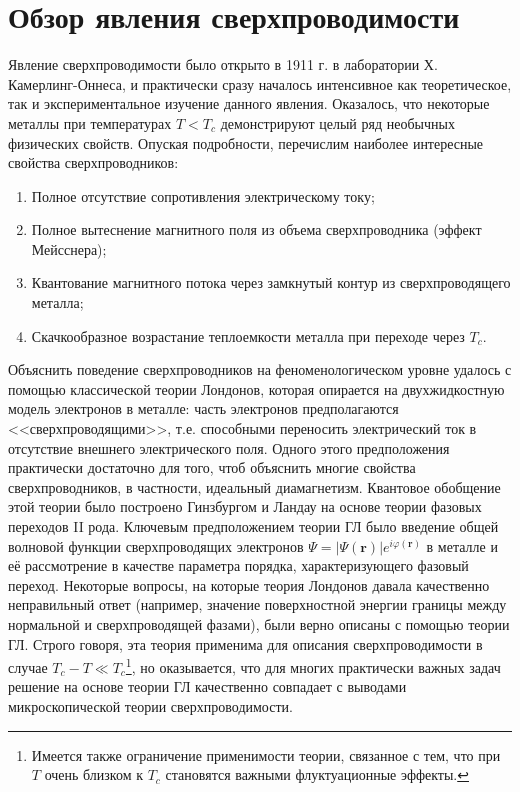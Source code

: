 \section{Обзор явления сверхпроводимости} \label{s1_sc_phys}
Явление сверхпроводимости было открыто в 1911 г. в лаборатории Х. Камерлинг-Оннеса, и практически сразу началось интенсивное как теоретическое, так и экспериментальное изучение данного явления. Оказалось, что некоторые металлы при температурах $T<T_c$ демонстрируют целый ряд необычных физических свойств. Опуская подробности, перечислим наиболее интересные свойства сверхпроводников:
\begin{enumerate}
	\item Полное отсутствие сопротивления электрическому току;
	\item Полное вытеснение магнитного поля из объема сверхпроводника (эффект Мейсснера);
	\item Квантование магнитного потока через замкнутый контур из сверхпроводящего металла;
	\item Скачкообразное возрастание теплоемкости металла при переходе через $T_c$.
\end{enumerate}	
Объяснить поведение сверхпроводников на феноменологическом уровне удалось с помощью классической теории Лондонов, которая опирается на двухжидкостную модель электронов в металле: часть электронов предполагаются <<сверхпроводящими>>, т.е. способными переносить электрический ток в отсутствие внешнего электрического поля. Одного этого предположения практически достаточно для того, чтоб объяснить многие свойства сверхпроводников, в частности, идеальный диамагнетизм. Квантовое обобщение этой теории было построено Гинзбургом и Ландау на основе теории фазовых переходов II рода. Ключевым предположением теории ГЛ было введение общей волновой функции сверхпроводящих электронов $\Psi = |\Psi(\mathbf{r})| e^{i\varphi({\mathbf{r}})}$ в металле и её рассмотрение в качестве параметра порядка, характеризующего фазовый переход. Некоторые вопросы, на которые теория Лондонов давала качественно неправильный ответ (например, значение поверхностной энергии границы между нормальной и сверхпроводящей фазами), были верно описаны с помощью теории ГЛ. Строго говоря, эта теория применима для описания сверхпроводимости в случае $T_c-T \ll T_c$\footnote[1]{Имеется также ограничение применимости теории, связанное с тем, что при $T$ очень близком к $T_c$ становятся важными флуктуационные эффекты.}, но оказывается, что для многих практически важных задач решение на основе теории ГЛ качественно совпадает с выводами микроскопической теории сверхпроводимости.

